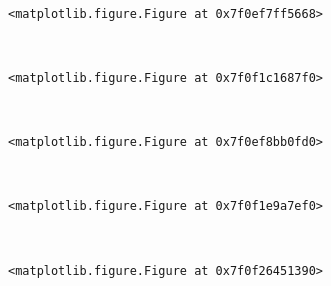 \documentclass[11pt]{article}
\begin{document}
    
    \begin{center}
    \end{center}
    { \hspace*{\fill} \\}
    
    
    \begin{verbatim}
<matplotlib.figure.Figure at 0x7f0ef7ff5668>
    \end{verbatim}

    
    \begin{center}
    \end{center}
    { \hspace*{\fill} \\}
    
    
    \begin{verbatim}
<matplotlib.figure.Figure at 0x7f0f1c1687f0>
    \end{verbatim}

    
    \begin{center}
    \end{center}
    { \hspace*{\fill} \\}
    
    
    \begin{verbatim}
<matplotlib.figure.Figure at 0x7f0ef8bb0fd0>
    \end{verbatim}

    
    \begin{center}
    \end{center}
    { \hspace*{\fill} \\}
    
    
    \begin{verbatim}
<matplotlib.figure.Figure at 0x7f0f1e9a7ef0>
    \end{verbatim}

    
    \begin{center}
    \end{center}
    { \hspace*{\fill} \\}
    
    
    \begin{verbatim}
<matplotlib.figure.Figure at 0x7f0f26451390>
    \end{verbatim}
\end{document}
